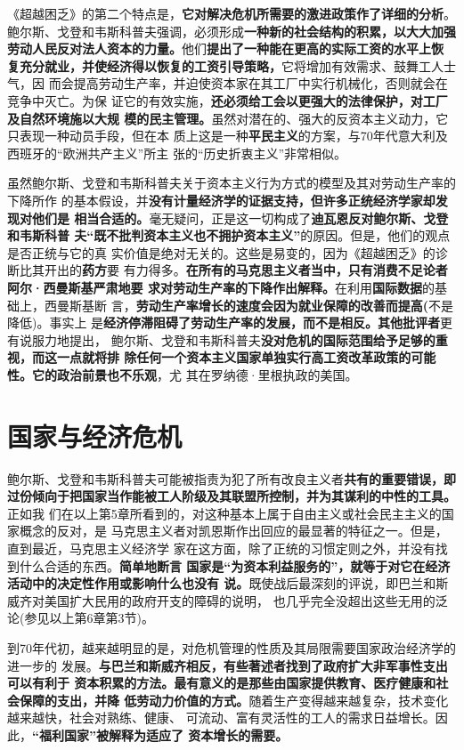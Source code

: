 《超越困乏》的第二个特点是，\textbf{它对解决危机所需要的激进政策作了详细的分析}。
鲍尔斯、戈登和韦斯科普夫强调，必须形成\textbf{一种新的社会结构的积累，以大大加强
  劳动人民反对法人资本的力量。}他们\textbf{提出了一种能在更高的实际工资的水平上恢
  复充分就业，并使经济得以恢复的工资引导策略，}它将增加有效需求、鼓舞工人士气，因
而会提高劳动生产率，并迫使资本家在其工厂中实行机械化，否则就会在竞争中灭亡。为保
证它的有效实施，\textbf{还必须给工会以更强大的法律保护，对工厂及自然环境施以大规
  模的民主管理。}虽然对潜在的、强大的反资本主义动力，它只表现一种动员手段，但在本
质上这是一种\textbf{平民主义}的方案，与70年代意大利及西班牙的“欧洲共产主义”所主
张的“历史折衷主义”非常相似。

虽然鲍尔斯、戈登和韦斯科普夫关于资本主义行为方式的模型及其对劳动生产率的下降所作
的基本假设，并\textbf{没有计量经济学的证据支持，但许多正统经济学家却发现对他们是
  相当合适的。}毫无疑问，正是这一切构成了\textbf{迪瓦恩反对鲍尔斯、戈登和韦斯科普
  夫“既不批判资本主义也不拥护资本主义”}的原因。但是，他们的观点是否正统与它的真
实价值是绝对无关的。这些是易变的，因为《超越困乏》的诊断比其开出的\textbf{药方}要
有力得多。\textbf{在所有的马克思主义者当中，只有消费不足论者阿尔·西曼斯基严肃地要
  求对劳动生产率的下降作出解释。}在利用\textbf{国际数据}的基础上，西曼斯基断
言，\textbf{劳动生产率增长的速度会因为就业保障的改善而提高(}不是降低)。事实上
是\textbf{经济停滞阻碍了劳动生产率的发展，而不是相反。其他批评者}更有说服力地提出，
鲍尔斯、戈登和韦斯科普夫\textbf{没对危机的国际范围给予足够的重视，而这一点就将排
  除任何一个资本主义国家单独实行高工资改革政策的可能性。它的政治前景也不乐观}，尤
其在罗纳德·里根执政的美国。

\section{国家与经济危机}

鲍尔斯、戈登和韦斯科普夫可能被指责为犯了所有改良主义者\textbf{共有的重要错误，即
  过份倾向于把国家当作能被工人阶级及其联盟所控制，并为其谋利的中性的工具。}正如我
们在以上第5章所看到的，对这种基本上属于自由主义或社会民主主义的国家概念的反对，是
马克思主义者对凯恩斯作出回应的最显著的特征之一。但是，直到最近，马克思主义经济学
家在这方面，除了正统的习惯定则之外，并没有找到什么合适的东西。\textbf{简单地断言
  国家是“为资本利益服务的”，就等于对它在经济活动中的决定性作用或影响什么也没有
  说。}既使战后最深刻的评说，即巴兰和斯威齐对美国扩大民用的政府开支的障碍的说明，
也几乎完全没超出这些无用的泛论(参见以上第6章第3节)。

到70年代初，越来越明显的是，对危机管理的性质及其局限需要国家政治经济学的进一步的
发展。\textbf{与巴兰和斯威齐相反，有些著述者找到了政府扩大非军事性支出可以有利于
  资本积累的方法。最有意义的是那些由国家提供教育、医疗健康和社会保障的支出，并降
  低劳动力价值的方式。}随着生产变得越来越复杂，技术变化越来越快，社会对熟练、健康、
可流动、富有灵活性的工人的需求日益增长。因此，\textbf{“福利国家”被解释为适应了
  资本增长的需要。}

